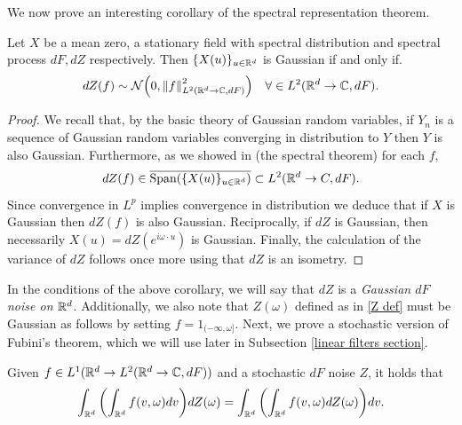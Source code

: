 \documentclass[
    a4paper,
    DIV=14,
    abstract=true,
    numbers=noenddot
]{scrartcl}
\begin{document}
We now prove an interesting corollary of the spectral representation theorem.
\begin{corollary}\label{Gaussian integral}
	Let $X$ be a mean zero, a stationary field with  spectral distribution and spectral process $dF,dZ$ respectively. Then $\{X(u)\}_{u\in\mathbb{R}^d}$ is Gaussian if and only if.
	\begin{equation*}
		dZ(f)\sim\mathcal{N}\qty(0,\left\lVert f \right\rVert^2_{L^2(\mathbb{R}^d\to\mathbb{C},dF)})\quad\forall \in L^2(\mathbb{R}^d\to\mathbb{C},dF).
	\end{equation*}
\end{corollary}
\begin{proof}
	We recall that, by the basic theory of Gaussian random variables, if $Y_n$ is a sequence of Gaussian random variables converging in distribution to $Y$ then $Y$ is also Gaussian. Furthermore, as we showed in  (the spectral theorem) for each $f$,
	$$dZ(f)\in\overline{\text{Span}(\{X(u)\}_{u\in\mathbb{R}^d})}\subset L^2(\mathbb{R}^d\to C,dF).$$
	Since convergence in $L^p$ implies convergence in distribution we deduce that if $X$ is Gaussian then $dZ(f)$ is also Gaussian. Reciprocally, if $dZ$ is Gaussian, then necessarily $X(u)=dZ(e^{i\omega\cdot u})$ is Gaussian. Finally, the calculation of the variance of $dZ$ follows once more using that $dZ$ is an isometry.
\end{proof}
In the conditions of the above corollary, we will say that $dZ$ is a \emph{Gaussian $dF$ noise on $\mathbb{R}^d$}. Additionally, we also note that $Z(\omega)$ defined as in \eqref{Z def} must be Gaussian as follows by setting $f=1_{(-\infty,\omega]}$. Next, we prove a stochastic version of Fubini's theorem, which we will use later in Subsection \ref{linear filters section}.
\begin{proposition}\label{stochastic Fbini}
	Given $f\in L^1(\mathbb{R}^d\to L^2(\mathbb{R}^d\to\mathbb{C},dF))$ and a stochastic $dF$ noise  $Z$, it holds that
	\begin{equation*}
		\int_{\mathbb{R}^d}\qty(\int_{\mathbb{R}^d}f(v,\omega)dv)dZ(\omega)=\int_{\mathbb{R}^d}\qty(\int_{\mathbb{R}^d}f(v,\omega)dZ(\omega))dv.
	\end{equation*}
\end{proposition}
\end{document}
